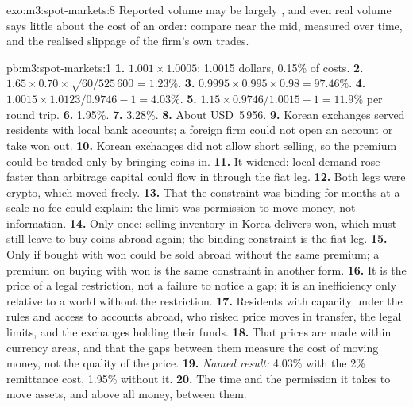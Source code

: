 \begin{solution}{exo:m3:spot-markets:8}
Reported volume may be largely , and even real volume says little about the cost of an order: compare
 near the mid, measured over time, and the realised slippage of the firm's own trades.
\end{solution}

\begin{solution}{pb:m3:spot-markets:1}
\textbf{1.} $1.001 \times 1.0005$: 1.0015 dollars, 0.15\% of costs. \textbf{2.} $1.65 \times 0.70 \times
\sqrt{60/525\,600} = 1.23\%$. \textbf{3.} $0.9995 \times 0.995 \times 0.98 = 97.46\%$. \textbf{4.} $1.0015
\times 1.0123/0.9746 - 1 = 4.03\%$. \textbf{5.} $1.15 \times 0.9746/1.0015 - 1 = 11.9\%$ per round trip.
\textbf{6.} 1.95\%. \textbf{7.} 3.28\%. \textbf{8.} About USD~5\,956. \textbf{9.} Korean exchanges served residents
with local bank accounts; a foreign firm could not open an account or take won out. \textbf{10.} Korean exchanges did
not allow short selling, so the premium could be traded only by bringing coins in. \textbf{11.} It widened: local demand rose
faster than arbitrage capital could flow in through the fiat leg. \textbf{12.} Both legs were crypto, which moved
freely. \textbf{13.} That the constraint was binding for months at a scale no fee could explain: the limit was
permission to move money, not information. \textbf{14.} Only once: selling inventory in Korea delivers won, which
must still leave to buy coins abroad again; the binding constraint is the fiat leg. \textbf{15.} Only if 
bought with won could be sold abroad without the same premium; a premium on buying  with won is the same
constraint in another form. \textbf{16.} It is the price of a legal restriction, not a failure to notice a gap; it
is an inefficiency only relative to a world without the restriction. \textbf{17.} Residents with capacity under the
rules and access to accounts abroad, who risked price moves in transfer, the legal limits, and the exchanges holding
their funds. \textbf{18.} That prices are made within currency areas, and that the gaps between them measure the cost
of moving money, not the quality of the price. \textbf{19.} \emph{Named result:} 4.03\% with the 2\% remittance cost,
1.95\% without it. \textbf{20.} The time and the permission it takes to move assets, and above all money, between
them.
\end{solution}

